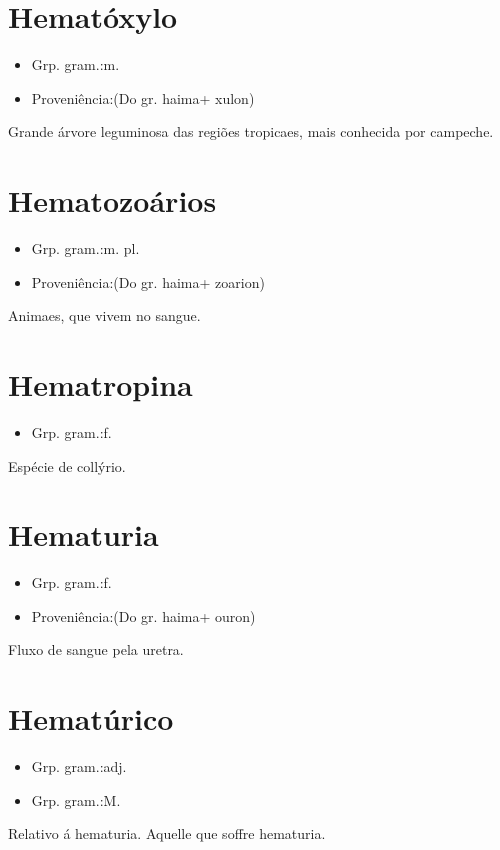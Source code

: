 \documentclass{article}
\begin{document}
\section{Hematóxylo}
\begin{itemize}
\item {Grp. gram.:m.}
\end{itemize}
\begin{itemize}
\item {Proveniência:(Do gr. \textunderscore haima\textunderscore  + \textunderscore xulon\textunderscore )}
\end{itemize}
Grande árvore leguminosa das regiões tropicaes, mais conhecida por \textunderscore campeche\textunderscore .
\section{Hematozoários}
\begin{itemize}
\item {Grp. gram.:m. pl.}
\end{itemize}
\begin{itemize}
\item {Proveniência:(Do gr. \textunderscore haima\textunderscore  + \textunderscore zoarion\textunderscore )}
\end{itemize}
Animaes, que vivem no sangue.
\section{Hematropina}
\begin{itemize}
\item {Grp. gram.:f.}
\end{itemize}
Espécie de collýrio.
\section{Hematuria}
\begin{itemize}
\item {Grp. gram.:f.}
\end{itemize}
\begin{itemize}
\item {Proveniência:(Do gr. \textunderscore haima\textunderscore  + \textunderscore ouron\textunderscore )}
\end{itemize}
Fluxo de sangue pela uretra.
\section{Hematúrico}
\begin{itemize}
\item {Grp. gram.:adj.}
\end{itemize}
\begin{itemize}
\item {Grp. gram.:M.}
\end{itemize}
Relativo á hematuria.
Aquelle que soffre hematuria.
\end{document}
